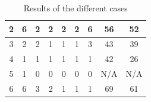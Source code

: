 \documentclass[12pt,a4paper,oneside]{article}
\numberwithin{equation}{section}
\numberwithin{equation}{section}
\theoremstyle{definition}
\begin{document}
\begin{table}[h!]
\begin{tabular}{|c|c|c|c|c|c|c|c|c|}
2             & 6                                                                 & 2                                                                 & 2                                                                 & 2                                                                 & 2                                                                 & 6                                                                 & \cellcolor[HTML]{FFFC9E}56                                     & 52                                                                  \\ \hline
3             & 2                                                                 & 2                                                                 & 1                                                                 & 1                                                                 & 1                                                                 & 3                                                                 & \cellcolor[HTML]{FFFC9E}43                                     & 39                                                                  \\ \hline
4             & 1                                                                 & 1                                                                 & 1                                                                 & 1                                                                 & 1                                                                 & 1                                                                 & \cellcolor[HTML]{FFCCC9}42                                     & 26                                                                  \\ \hline
5             & 1                                                                 & 0                                                                 & 0                                                                 & 0                                                                 & 0                                                                 & 0                                                                 & N/A                                                            & N/A                                                                 \\ \hline
6             & 6                                                                 & 3                                                                 & 2                                                                 & 1                                                                 & 1                                                                 & 1                                                                 & \cellcolor[HTML]{FFFC9E}69                                     & 61                                                                  \\ \hline
\end{tabular}
\caption{Results of the different cases}
\label{results}
\end{table}
\end{document}
